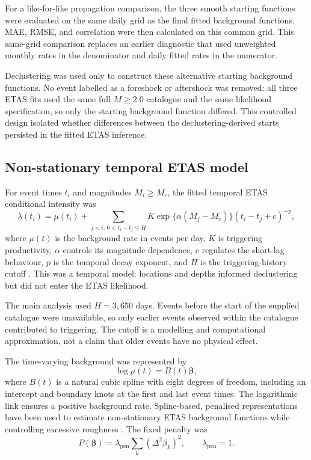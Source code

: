 For a like-for-like propagation comparison, the three smooth starting
functions were evaluated on the same daily grid as the final fitted
background functions. MAE, RMSE, and correlation were then calculated on this
common grid. This same-grid comparison replaces an earlier diagnostic that
used unweighted monthly rates in the denominator and daily fitted rates in
the numerator.

Declustering was used only to construct these alternative starting
background functions. No event labelled as a foreshock or aftershock was
removed: all three ETAS fits used the same full $M\geq2.0$ catalogue and the
same likelihood specification, so only the starting background function
differed. This controlled design isolated whether differences between the
declustering-derived starts persisted in the fitted ETAS inference.

\subsection{Non-stationary temporal ETAS model}
\label{sec:etas_model}

For event times $t_i$ and magnitudes $M_i\geq M_c$, the fitted temporal ETAS
conditional intensity was
\begin{equation}
\lambda(t_i)=\mu(t_i)+
\sum_{j<i:\,0<t_i-t_j\leq H}
K\exp\{\alpha(M_j-M_c)\}(t_i-t_j+c)^{-p},
\label{eq:etas_intensity}
\end{equation}
where $\mu(t)$ is the background rate in events per day, $K$ is triggering
productivity, $\alpha$ controls its magnitude dependence, $c$ regulates the
short-lag behaviour, $p$ is the temporal decay exponent, and $H$ is the
triggering-history cutoff \citep{ogata1988statistical}. This was a temporal
model: locations and depths informed declustering but did not enter the ETAS
likelihood.

The main analysis used $H=3,650$ days. Events before the start of the supplied
catalogue were unavailable, so only earlier events observed within the
catalogue contributed to triggering. The cutoff is a modelling and
computational approximation, not a claim that older events have no physical
effect.

The time-varying background was represented by
\begin{equation}
\log\mu(t)=B(t)\boldsymbol\beta,
\label{eq:background_spline}
\end{equation}
where $B(t)$ is a natural cubic spline with eight degrees of freedom,
including an intercept and boundary knots at the first and last event times.
The logarithmic link ensures a positive background rate. Spline-based,
penalised representations have been used to estimate non-stationary ETAS
background functions while controlling excessive roughness
\citep{kattamanchi2017nonstationary}. The fixed penalty was
\[
P(\boldsymbol\beta)=
\lambda_{\mathrm{pen}}
\sum_k(\Delta^2\beta_k)^2,
\qquad \lambda_{\mathrm{pen}}=1.
\]

